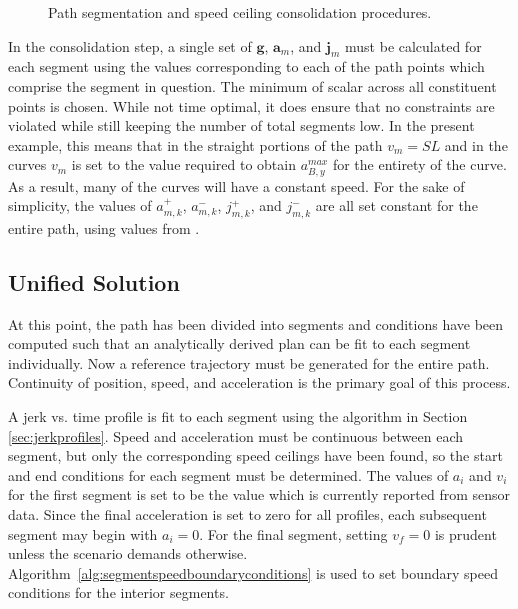 \documentclass[letterpaper, 10 pt, conference]{ieeeconf}  %
\begin{document}
\begin{figure}[thpb]
{  }
  \caption{Path segmentation and speed ceiling consolidation procedures.}
  \label{fig:1Dto2DandSegmentation}
\end{figure}

In the consolidation step, a single set of $\mathbf{g}$, $\mathbf{a}_m$, and $\mathbf{j}_m$ must be calculated for each segment using the values corresponding to each of the path points which comprise the segment in question.
The minimum of scalar across all constituent points is chosen.
While not time optimal, it does ensure that no constraints are violated while still keeping the number of total segments low.
In the present example, this means that in the straight portions of the path $v_m = SL$ and in the curves $v_m$ is set to the value required to obtain $a_{B,y}^{max}$ for the entirety of the curve.
As a result, many of the curves will have a constant speed.
For the sake of simplicity, the values of $a^+_{m,k}$, $a^-_{m,k}$, $j^+_{m,k}$, and $j^-_{m,k}$ are all set constant for the entire path, using values from \cite{Maurya2012,Hoberock1977,Long2000}.


\subsection{Unified Solution} \label{sec:unifiedsolution}

At this point, the path has been divided into segments and conditions have been computed such that an analytically derived plan can be fit to each segment individually.
Now a reference trajectory must be generated for the entire path.
Continuity of position, speed, and acceleration is the primary goal of this process.

A jerk vs. time profile is fit to each segment using the algorithm in Section \ref{sec:jerkprofiles}.
Speed and acceleration must be continuous between each segment, but only the corresponding speed ceilings have been found, so the start and end conditions for each segment must be determined.
The values of $a_i$ and $v_i$ for the first segment is set to be the value which is currently reported from sensor data.
Since the final acceleration is set to zero for all profiles, each subsequent segment may begin with $a_i = 0$.
For the final segment, setting $v_f = 0$ is prudent unless the scenario demands otherwise.
Algorithm~\ref{alg:segmentspeedboundaryconditions} is used to set boundary speed conditions for the interior segments. 
\end{document}
